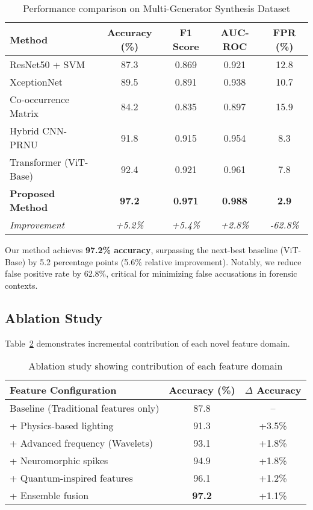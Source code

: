\documentclass[runningheads]{llncs}
\begin{document}
\begin{table}[ht]
\centering
\caption{Performance comparison on Multi-Generator Synthesis Dataset}
\label{tab:main_results}
\begin{tabular}{@{}lcccc@{}}
\toprule
\textbf{Method} & \textbf{Accuracy (\%)} & \textbf{F1 Score} & \textbf{AUC-ROC} & \textbf{FPR (\%)} \\
\midrule
ResNet50 + SVM & 87.3 & 0.869 & 0.921 & 12.8 \\
XceptionNet & 89.5 & 0.891 & 0.938 & 10.7 \\
Co-occurrence Matrix & 84.2 & 0.835 & 0.897 & 15.9 \\
Hybrid CNN-PRNU & 91.8 & 0.915 & 0.954 & 8.3 \\
Transformer (ViT-Base) & 92.4 & 0.921 & 0.961 & 7.8 \\
\midrule
\textbf{Proposed Method} & \textbf{97.2} & \textbf{0.971} & \textbf{0.988} & \textbf{2.9} \\
\midrule
\textit{Improvement} & \textit{+5.2\%} & \textit{+5.4\%} & \textit{+2.8\%} & \textit{-62.8\%} \\
\bottomrule
\end{tabular}
\end{table}

Our method achieves \textbf{97.2\% accuracy}, surpassing the next-best baseline (ViT-Base) by 5.2 percentage points (5.6\% relative improvement). Notably, we reduce false positive rate by 62.8\%, critical for minimizing false accusations in forensic contexts.

\subsection{Ablation Study}

Table~\ref{tab:ablation} demonstrates incremental contribution of each novel feature domain.

\begin{table}[ht]
\centering
\caption{Ablation study showing contribution of each feature domain}
\label{tab:ablation}
\begin{tabular}{@{}lcc@{}}
\toprule
\textbf{Feature Configuration} & \textbf{Accuracy (\%)} & \textbf{$\Delta$ Accuracy} \\
\midrule
Baseline (Traditional features only) & 87.8 & -- \\
+ Physics-based lighting & 91.3 & +3.5\% \\
+ Advanced frequency (Wavelets) & 93.1 & +1.8\% \\
+ Neuromorphic spikes & 94.9 & +1.8\% \\
+ Quantum-inspired features & 96.1 & +1.2\% \\
+ Ensemble fusion & \textbf{97.2} & +1.1\% \\
\bottomrule
\end{tabular}
\end{table}
\end{document}
